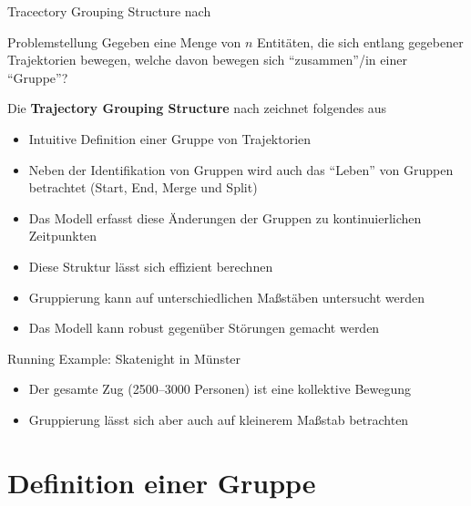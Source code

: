 \documentclass[
wide,
10pt,
xcolor={x11names,svgnames},
hyperref={pdfauthor={Jannes Bantje},colorlinks,urlcolor=maincolor,hidelinks=false,linkcolor=maincolor},
pantone312, 	%
euler-digits,
]{beamer}
\newcommand{\bet}[1]{\textbf{\color{maincolor}#1}}
\theoremstyle{definition}
\begin{document}
\begin{frame}{Tracectory Grouping Structure nach \textcite{buchin2015}}
    \begin{block}{Problemstellung}
        Gegeben eine Menge von $n$ Entitäten, die sich entlang gegebener Trajektorien bewegen, welche davon bewegen sich \enquote{zusammen}/in einer \enquote{Gruppe}?
    \end{block}
    Die \bet{Trajectory Grouping Structure} nach \textcite{buchin2015} zeichnet folgendes aus\pause
    \begin{itemize}[<+->]
        \item Intuitive Definition einer Gruppe von Trajektorien
        \item Neben der Identifikation von Gruppen wird auch das \enquote{Leben} von Gruppen betrachtet (Start, End, Merge und Split)
        \item Das Modell erfasst diese Änderungen der Gruppen zu kontinuierlichen Zeitpunkten
        \item Diese Struktur lässt sich effizient berechnen
        \item Gruppierung kann auf unterschiedlichen Maßstäben untersucht werden
        \item Das Modell kann robust gegenüber Störungen gemacht werden
    \end{itemize}
\end{frame}

\begin{frame}{Running Example: Skatenight in Münster}
    \begin{itemize}
        \item Der gesamte Zug (2500--3000 Personen) ist eine kollektive Bewegung
        \item Gruppierung lässt sich aber auch auf kleinerem Maßstab betrachten
    \end{itemize}
\end{frame}

\section{Definition einer Gruppe}
\end{document}
